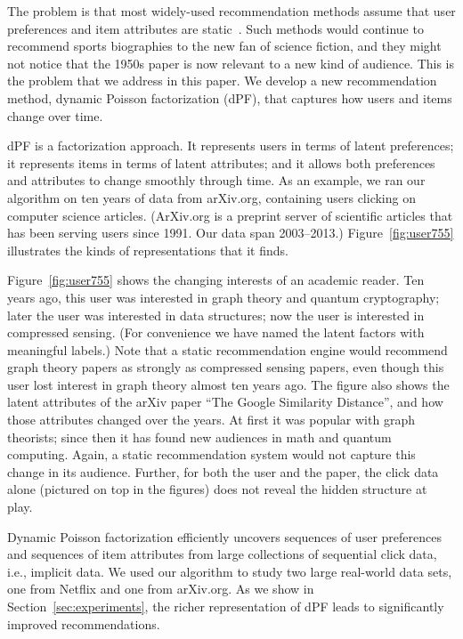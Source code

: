 \documentclass{sig-alternate}
\begin{document}
The problem is that most widely-used recommendation methods assume
that user preferences and item attributes are
static~\citep{yi_beyond_2014,koren_ordrec_2011,ekstrand_collaborative_2011}.
Such methods would continue to recommend sports biographies to the new
fan of science fiction, and they might not notice that the 1950s paper
is now relevant to a new kind of audience.  This is the problem that
we address in this paper. We develop a new recommendation method,
dynamic Poisson factorization (dPF), that captures how users and items
change over time.

dPF is a factorization approach.  It represents users in terms of
latent preferences; it represents items in terms of latent attributes;
and it allows both preferences and attributes to change smoothly
through time.  As an example, we ran our algorithm on ten years of
data from arXiv.org, containing users clicking on computer science
articles.  (ArXiv.org is a preprint server of scientific articles that
has been serving users since 1991.  Our data span 2003--2013.)
Figure~\ref{fig:user755} illustrates the kinds
of representations that it finds.

Figure~\ref{fig:user755} shows the changing interests of an academic
reader. Ten years ago, this user was interested in graph theory and
quantum cryptography; later the user was interested in data
structures; now the user is interested in compressed sensing.  (For
convenience we have named the latent factors with meaningful labels.)
Note that a static recommendation engine would recommend graph theory
papers as strongly as compressed sensing papers, even though this user
lost interest in graph theory almost ten years ago. The figure also shows the latent attributes of the arXiv
paper ``The Google Similarity Distance'', and how those attributes
changed over the years.  At first it was popular with graph theorists;
since then it has found new audiences in math and quantum computing.
Again, a static recommendation system would not capture this change in
its audience.  Further, for both the user and the paper, the click
data alone (pictured on top in the figures) does not reveal the hidden
structure at play.

Dynamic Poisson factorization efficiently uncovers sequences of user
preferences and sequences of item attributes from large collections of
sequential click data, i.e., implicit data.  We used our algorithm to
study two large real-world data sets, one from Netflix and one from
arXiv.org. As we show in Section~\ref{sec:experiments}, the richer
representation of dPF leads to significantly improved recommendations.
\end{document}

